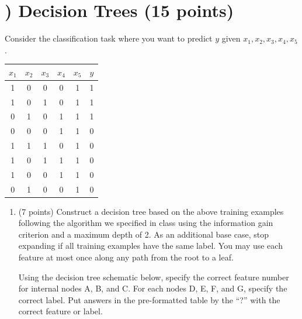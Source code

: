 \documentclass[11pt]{article}
\newcounter{QuestionCounter}
\newcounter{SubQuestionCounter}[QuestionCounter]
\newcommand{\newquestion}{\stepcounter{QuestionCounter}\setcounter{SubQuestionCounter}{1}\newpage}
\begin{document}
\newquestion
\section*{) Decision Trees (15 points)} {
Consider the classification task where you want to predict $y$ given $x_1, x_2,
x_3, x_4, x_5$.
\begin{center}
\begin{tabular}{ ccccc|c }
 $x_1$ & $x_2$ & $x_3$ & $x_4$ & $x_5$ & $y$ \\\cline{1-5}
 \hline
 1 & 0 & 0 & 0 & 1 & 1 \\
 1 & 0 & 1 & 0 & 1 & 1 \\
 0 & 1 & 0 & 1 & 1 & 1 \\
 0 & 0 & 0 & 1 & 1 & 0 \\
 1 & 1 & 1 & 0 & 1 & 0 \\
 1 & 0 & 1 & 1 & 1 & 0 \\
 1 & 0 & 0 & 1 & 1 & 0 \\
 0 & 1 & 0 & 0 & 1 & 0 \\
\end{tabular}
\end{center}

\begin{enumerate}[{(1)}]

\item (7 points) Construct a decision tree based on the above training examples
  following the algorithm we specified in class using the information gain
  criterion and a maximum depth of 2.  As an additional base case, stop
  expanding if all training examples have the same label. You may use each
  feature at most once along any path from the root to a leaf.

  Using the decision tree schematic below, specify the correct feature number
  for internal nodes A, B, and C.  For each nodes D, E, F, and G, specify the
  correct label.  Put answers in the pre-formatted table by the ``?''  with the
  correct feature or label.



\end{enumerate}}
\end{document}
